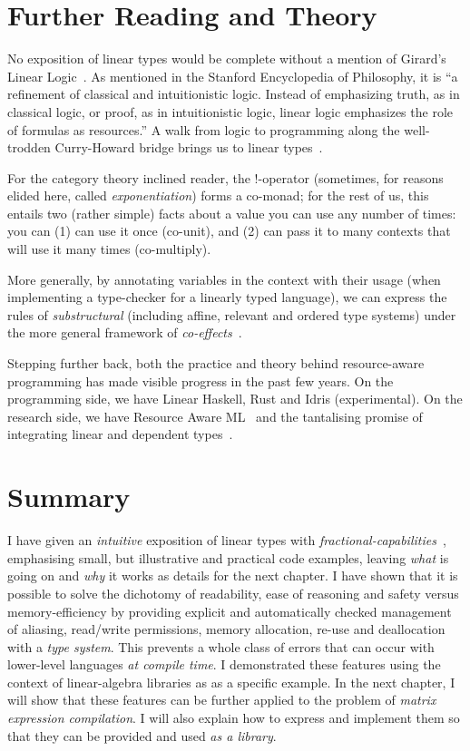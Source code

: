 \section{Further Reading and Theory}\label{sec:further}


No exposition of linear types would be complete without a mention of Girard's
Linear Logic~\cite{girard}. As mentioned in the Stanford Encyclopedia of
Philosophy, it is ``a refinement of classical and intuitionistic logic. Instead
of emphasizing truth, as in classical logic, or proof, as in intuitionistic
logic, linear logic emphasizes the role of formulas as resources.'' A walk from
logic to programming along the well-trodden Curry-Howard bridge brings us to
linear types~\cite{wadler}.

For the category theory inclined reader, the !-operator (sometimes, for reasons
elided here, called \emph{exponentiation}) forms a co-monad; for the rest of
us, this entails two (rather simple) facts about a value you can use any number
of times: you can (1) can use it once (co-unit), and (2) can pass it to many
contexts that will use it many times (co-multiply).

More generally, by annotating variables in the context with their usage (when
implementing a type-checker for a linearly typed language), we can express the
rules of \emph{substructural} (including affine, relevant and ordered type
systems) under the more general framework of \emph{co-effects}~\cite{petricek}.

Stepping further back, both the practice and theory behind resource-aware
programming has made visible progress in the past few years.  On the
programming side, we have Linear Haskell, Rust and Idris (experimental). On the
research side, we have Resource Aware ML~\cite{hoffmann} and the tantalising
promise of integrating linear and dependent types~\cite{atkey}.

\clearpage%
\section{Summary}

I have given an \emph{intuitive} exposition of linear types with
\emph{fractional-capabilities}~\cite{boyland}, emphasising small, but
illustrative and practical code examples, leaving \emph{what} is going on and
\emph{why} it works as details for the next chapter. I have shown that it is
possible to solve the dichotomy of readability, ease of reasoning and safety
versus memory-efficiency by providing explicit and automatically checked
management of aliasing, read/write permissions, memory allocation, re-use and
deallocation with a \emph{type system}. This prevents a whole class of errors
that can occur with lower-level languages \emph{at compile time}. I
demonstrated these features using the context of linear-algebra libraries as as
a specific example. In the next chapter, I will show that these features can be
further applied to the problem of \emph{matrix expression compilation}. I will
also explain how to express and implement them so that they can be provided and
used \emph{as a library}.
